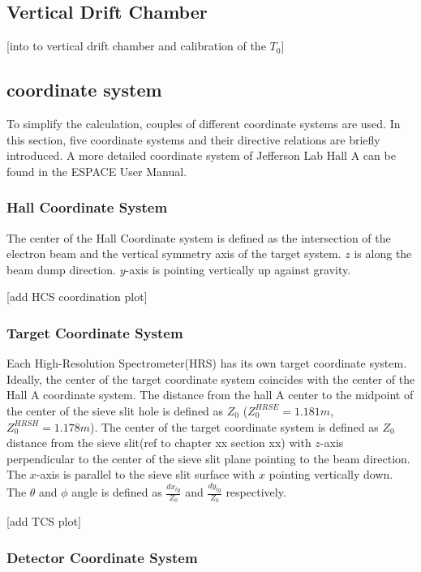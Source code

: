 \subsection{Vertical Drift Chamber}
[into to vertical drift chamber and calibration of the $T_0$]

\subsection{coordinate system}


To simplify the calculation, couples of different coordinate systems are used. In this section, five coordinate systems and their directive relations are briefly introduced. A more detailed coordinate system of Jefferson Lab Hall A can be found in the ESPACE User Manual\cite{espace2002manual}.  

\subsubsection{Hall Coordinate System}
The center of the Hall Coordinate system is defined as the intersection of the electron beam and the vertical symmetry axis of the target system. $z$ is along the beam dump direction. $y$-axis is pointing vertically up against gravity.

[add HCS coordination plot]

\subsubsection{Target Coordinate System}

Each High-Resolution Spectrometer(HRS) has its own target coordinate system. Ideally, the center of the target coordinate system coincides with the center of the Hall A coordinate system. The distance from the hall A center to the midpoint of the center of the sieve slit hole is defined as $Z_0$ ($Z^{HRSE}_0 = 1.181 m$, $Z^{HRSH}_0 = 1.178 m$). The center of the target coordinate system is defined as $Z_0$ distance from the sieve slit(ref to chapter xx section xx) with $z$-axis perpendicular to the center of the sieve slit plane pointing to the beam direction. The $x$-axis is parallel to the sieve slit surface with $x$ pointing vertically down. The $\theta$ and $\phi$ angle is defined as $\frac{dx_{tg}}{Z_0}$ and $\frac{dy_{tg}}{Z_0}$ respectively.

[add TCS plot]


\subsubsection{Detector Coordinate System}

